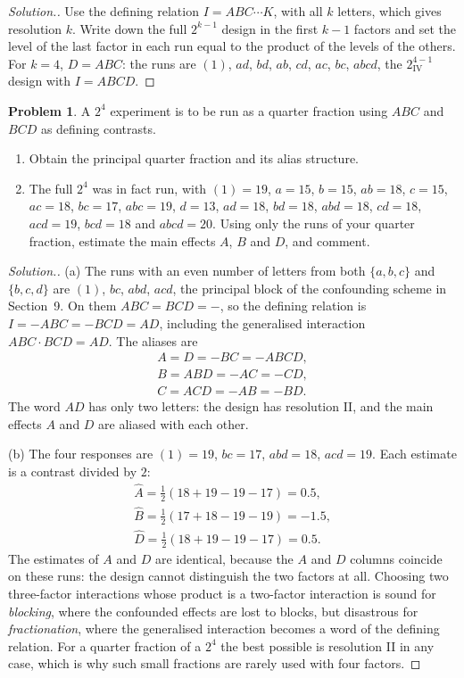 \documentclass[11pt,a4paper]{article}
\numberwithin{equation}{section}
\theoremstyle{definition}
\newtheorem{problemx}{Problem}[subsection]
\newenvironment{problem}{\begin{problemx}}{\end{problemx}}
\newenvironment{solution}
  {\renewcommand{\qedsymbol}{}\begin{proof}[\textit{Solution}.]}
  {\end{proof}}
\begin{document}
\begin{solution}
Use the defining relation $I = ABC\cdots K$, with all $k$ letters, which gives resolution $k$. Write down the full $2^{k-1}$ design in the first $k - 1$ factors and set
the level of the last factor in each run equal to the product of the levels of the others. For $k = 4$, $D = ABC$: the runs are $(1)$, $ad$, $bd$, $ab$, $cd$, $ac$, $bc$,
$abcd$, the $2^{4-1}_{\mathrm{IV}}$ design with $I = ABCD$.
\end{solution}

\begin{problem}
A $2^4$ experiment is to be run as a quarter fraction using $ABC$ and $BCD$ as defining contrasts.
\begin{enumerate}[label=(\alph*)]
\item Obtain the principal quarter fraction and its alias structure.
\item The full $2^4$ was in fact run, with $(1) = 19$, $a = 15$, $b = 15$, $ab = 18$, $c = 15$, $ac = 18$, $bc = 17$, $abc = 19$, $d = 13$, $ad = 18$, $bd = 18$, $abd = 18$, $cd = 18$, $acd = 19$, $bcd = 18$
and $abcd = 20$. Using only the runs of your quarter fraction, estimate the main effects $A$, $B$ and $D$, and comment.
\end{enumerate}
\end{problem}

\begin{solution}
(a) The runs with an even number of letters from both $\{a, b, c\}$ and $\{b, c, d\}$ are $(1)$, $bc$, $abd$, $acd$, the principal block of the confounding scheme in
Section~9. On them $ABC = BCD = -$, so the defining relation is $I = -ABC = -BCD = AD$, including the generalised interaction $ABC \cdot BCD = AD$. The aliases are
\begin{gather*}
A = D = -BC = -ABCD , \\
B = ABD = -AC = -CD , \\
C = ACD = -AB = -BD .
\end{gather*}
The word $AD$ has only two letters: the design has resolution II, and the main effects $A$ and $D$ are aliased with each other.

(b) The four responses are $(1) = 19$, $bc = 17$, $abd = 18$, $acd = 19$. Each estimate is a contrast divided by $2$:
\begin{gather*}
\hat A = \tfrac12(18 + 19 - 19 - 17) = 0.5 , \\
\hat B = \tfrac12(17 + 18 - 19 - 19) = -1.5 , \\
\hat D = \tfrac12(18 + 19 - 19 - 17) = 0.5 .
\end{gather*}
The estimates of $A$ and $D$ are identical, because the $A$ and $D$ columns coincide on these runs: the design cannot distinguish the two factors at
all. Choosing two three-factor interactions whose product is a two-factor interaction is sound for \emph{blocking}, where the confounded effects
are lost to blocks, but disastrous for \emph{fractionation}, where the generalised interaction becomes a word of the defining relation. For a quarter
fraction of a $2^4$ the best possible is resolution II in any case, which is why such small fractions are rarely used with four factors.
\end{solution}
\end{document}
